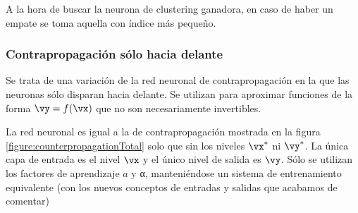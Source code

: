 \obs A la hora de buscar la neurona de clustering ganadora, en caso de haber un empate se toma aquella con índice más pequeño.

\subsubsection{Contrapropagación sólo hacia delante}
Se trata de una variación de la red neuronal de contrapropagación en la que las neuronas sólo disparan hacia delante. Se utilizan para aproximar funciones de la forma $\vy=f(\vx)$ que no son necesariamente invertibles.

La red neuronal es igual a la de contrapropagación mostrada en la figura \ref{figure:counterpropagationTotal} solo que sin los niveles $\vx^*$ ni $\vy^*$. La única capa de entrada es el nivel $\vx$ y el único nivel de salida es $\vy$. Sólo se utilizan los factores de aprendizaje $a$ y α, manteniéndose un sistema de entrenamiento equivalente (con los nuevos conceptos de entradas y salidas que acabamos de comentar)